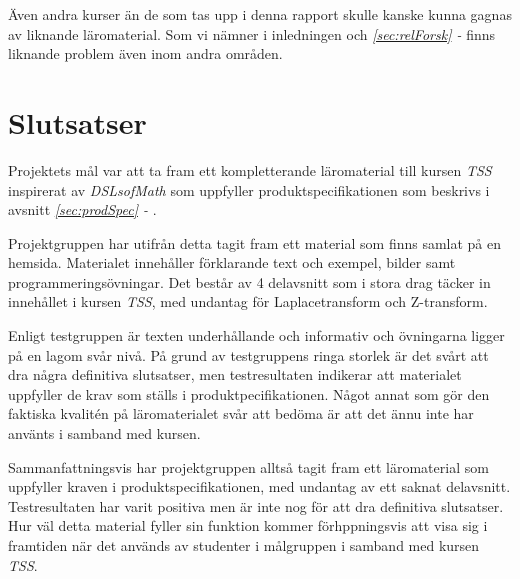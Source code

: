 \documentclass[12pt,a4paper,twoside,openright]{article}
\begin{document}
Även andra kurser än de som tas upp i denna rapport skulle kanske
kunna gagnas av liknande läromaterial. Som vi nämner i inledningen och
\textit{\ref{sec:relForsk} - } finns liknande
problem även inom andra områden.


\section{Slutsatser}

Projektets mål var att ta fram ett kompletterande läromaterial till
kursen \textit{TSS} inspirerat av \textit{DSLsofMath} som uppfyller
produktspecifikationen som beskrivs i avsnitt
\textit{\ref{sec:prodSpec} - }.

Projektgruppen har utifrån detta tagit fram ett material som finns
samlat på en hemsida. Materialet innehåller förklarande text och
exempel, bilder samt programmeringsövningar. Det består av 4
delavsnitt som i stora drag täcker in innehållet i kursen
\textit{TSS}, med undantag för Laplacetransform och Z-transform.

Enligt testgruppen är texten underhållande och informativ och
övningarna ligger på en lagom svår nivå. På grund av testgruppens
ringa storlek är det svårt att dra några definitiva slutsatser, men
testresultaten indikerar att materialet uppfyller de krav som ställs i
produktpecifikationen. Något annat som gör den faktiska kvalitén på
läromaterialet svår att bedöma är att det ännu inte har använts i
samband med kursen.

Sammanfattningsvis har projektgruppen alltså tagit fram ett
läromaterial som uppfyller kraven i produktspecifikationen, med
undantag av ett saknat delavsnitt. Testresultaten har varit positiva
men är inte nog för att dra definitiva slutsatser. Hur väl detta
material fyller sin funktion kommer förhppningsvis att visa sig i
framtiden när det används av studenter i målgruppen i samband med
kursen \textit{TSS}.

\newpage




\newpage

\appendix
\end{document}
